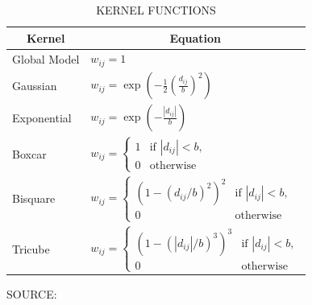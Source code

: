 \begin{table}[!hbtp]
    \footnotesize
    \captionsetup{justification=raggedright,
        singlelinecheck=false,
        font=footnotesize}
    \caption{KERNEL FUNCTIONS}
    \centering
    \begin{tabular}{ll}
        \hline
        \multicolumn{1}{c}{\textbf{Kernel}} & \multicolumn{1}{c}{\textbf{Equation}}  \\
        \hline
        Global Model             & $w_{ij} = 1$                              \\
        Gaussian \rule{0pt}{3ex} & $w_{ij} = \exp \left(- \frac{1}{2} \left(\frac{d_{ij}}{b}\right)^2\right)$ \\
        Exponential  \rule{0pt}{4ex} & $w_{ij} = \exp \left(- \frac{|d_{ij}|}{b}\right)$               \\
        Boxcar \rule{0pt}{4ex} & $w_{ij} = \begin{cases}
            1 & \mbox{if } |d_{ij}| < b, \\
            0 & \mbox{otherwise}
                                 \end{cases}$                               \\
        Bisquare \rule{0pt}{4ex} & $w_{ij} = \begin{cases}
            \left(1 - \left(d_{ij}/b\right)^2\right)^2 & \mbox{if } |d_{ij}| < b, \\
            0 & \mbox{otherwise}
                                 \end{cases}$                               \\
        Tricube \rule{0pt}{4ex} & $w_{ij} = \begin{cases}
            \left(1 - \left(|d_{ij}|/b\right)^3\right)^3 & \mbox{if } |d_{ij}| < b, \\
            0 & \mbox{otherwise}
                                 \end{cases}$                               \\
        \hline
        \end{tabular}
    \label{tab:kernel}
    \par \vspace{2mm} \footnotesize \raggedright
    SOURCE: \textcite{Gollini2013}
\end{table}

